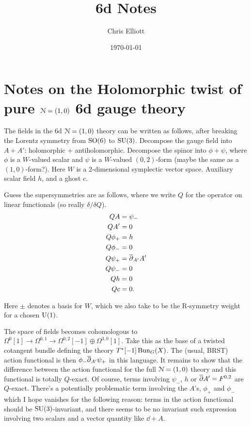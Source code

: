\documentclass[10pt, oneside]{article}
\title{6d Notes}
\author{Chris Elliott}
\date{\today}
\begin{document}
\section{Notes on the Holomorphic twist of pure $\mathcal{N}=(1,0)$ 6d gauge theory}

The fields in the 6d $\mathcal{N}=(1,0)$ theory can be written as follows, after breaking the Lorentz symmetry from $\mathrm{SO}(6)$ to $\mathrm{SU}(3)$.  Decompose the gauge field into $A + A'$: holomorphic + antiholomorphic.
Decompose the spinor into $\phi + \psi$, where $\phi$ is a $W$-valued scalar and $\psi$ is a $W$-valued $(0,2)$-form (maybe the same as a $(1,0)$-form?).  Here $W$ is a 2-dimensional symplectic vector space.
Auxiliary scalar field $h$, and a ghost $c$.

Guess the supersymmetries are as follows, where we write $Q$ for the operator on linear functionals (so really $\delta / \delta Q$).
\begin{align*}
QA &= \psi_-\\
QA'&= 0\\
Q\phi_+ &= h\\
Q\phi_- &= 0\\
Q\psi_+ &= \overline{\partial}_{A'} A'\\
Q\psi_- &= 0\\
Qh &= 0\\
Qc &= 0.
\end{align*}

Here $\pm$ denotes a basis for $W$, which we also take to be the R-symmetry weight for a chosen $\mathrm{U}(1)$.

The space of fields becomes cohomologous to $\Omega^0[1] \to \Omega^{0,1} \to \Omega^{0,2}[-1] \oplus \Omega^{3,0}[1]$.  Take this as the base of a twisted cotangent bundle defining the theory $T^*[-1]\operatorname{Bun}_G(X)$.  The (usual, BRST) action functional is then $\phi_- \overline{\partial}_{A'} \psi_+$ in this language.  It remains to show that the difference between the action functional for the full $\mathcal{N}=(1,0)$ theory and this functional is totally $Q$-exact.  Of course, terms involving $\psi_-$, $h$ or $\overline{\partial} A' = F^{0,2}$ are $Q$-exact.  There's a potentially problematic term involving the $A$'s, $\phi_+$ and $\phi_-$ which I hope vanishes for the following reason: terms in the action functional should be $\mathrm{SU}(3)$-invariant, and there seems to be no invariant such expression involving two scalars and a vector quantity like $\dd + A$.
\end{document}
